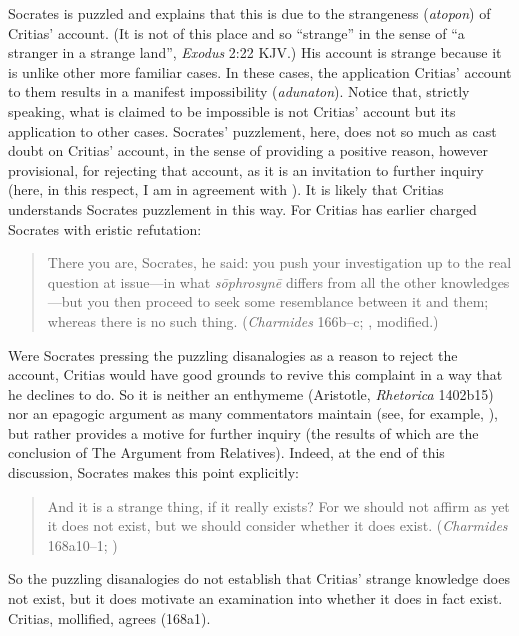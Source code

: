 Socrates is puzzled and explains that this is due to the strangeness (\emph{atopon}) of  Critias' account. (It is not of this place and so ``strange'' in the sense of ``a stranger in a strange land'', \emph{Exodus} 2:22 KJV.) His account is strange because it is unlike other more familiar cases. In these cases, the application Critias' account to them results in a manifest impossibility (\emph{adunaton}). Notice that, strictly speaking, what is claimed to be impossible is not Critias' account but its application to other cases. Socrates' puzzlement, here, does not so much as cast doubt on Critias' account, in the sense of providing a positive reason, however provisional, for rejecting that account, as it is an invitation to further inquiry (here, in this respect, I am in agreement with \citealt{Politis:2008nv}). It is likely that Critias understands Socrates puzzlement in this way. For Critias has earlier charged Socrates with eristic refutation:
\begin{quote}
	There you are, Socrates, he said: you push your investigation up to the real question at issue—in what \emph{sōphrosynē} differs from all the other knowledges—but you then proceed to seek some resemblance between it and them; whereas there is no such thing. (\emph{Charmides} 166b–c; \citealt[53]{Lamb:1927qw}, modified.)
\end{quote}	
Were Socrates pressing the puzzling disanalogies as a reason to reject the account, Critias would have good grounds to revive this complaint in a way that he declines to do. So it is neither an enthymeme (Aristotle, \emph{Rhetorica} 1402b15) nor an epagogic argument as many commentators maintain (see, for example, \citealt[41]{Robinson:1941yb}), but rather provides a motive for further inquiry (the results of which are the conclusion of The Argument from Relatives). Indeed, at the end of this discussion, Socrates makes this point explicitly:
\begin{quote}
	And it is a strange thing, if it really exists? For we should not affirm as yet it does not exist, but we should consider whether it does exist. (\emph{Charmides} 168a10–1; \citealt[61]{Lamb:1927qw})
\end{quote}
So the puzzling disanalogies do not establish that Critias' strange knowledge does not exist, but it does motivate an examination into whether it does in fact exist. Critias, mollified, agrees (168a1).

